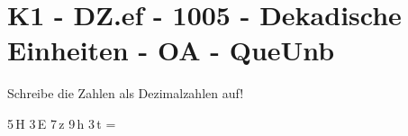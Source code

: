 \section{K1 - DZ.ef - 1005 - Dekadische Einheiten - OA - QueUnb}

\begin{beispiel}{0} %
				Schreibe die Zahlen als Dezimalzahlen auf!\leer
					
					5\,H 3\,E 7\,z 9\,h 3\,t = 
\end{beispiel}